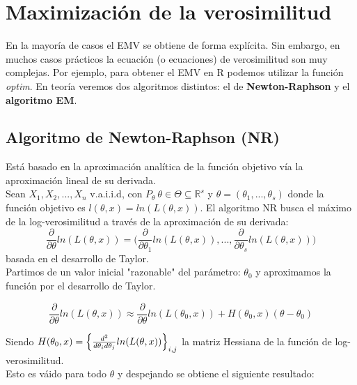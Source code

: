 
\section{Maximización de la verosimilitud}

En la mayoría de casos el EMV se obtiene de forma explícita. Sin embargo, en muchos casos prácticos la ecuación (o ecuaciones) de verosimilitud son muy complejas.
Por ejemplo, para obtener el EMV en R podemos utilizar la función \textit{optim}. En teoría veremos dos algoritmos distintos: el de \textbf{Newton-Raphson} y el \textbf{algoritmo EM}. 

\subsection*{Algoritmo de Newton-Raphson (NR)}

Está basado en la aproximación analítica de la función objetivo vía la aproximación lineal de su derivada. \\

Sean $X_1, X_2,...,X_n$ v.a.i.i.d, con $P_\theta\ \theta\in\Theta\subseteq \mathbb{R}^s$ y $\theta=(\theta_1,...,\theta_s)$ donde la función objetivo es $l(\theta,x)=ln(L(\theta,x))$.
El algoritmo NR busca el máximo de la log-verosimilitud a través de la aproximación de su derivada: 
$$\frac{\partial}{\partial\theta}ln(L(\theta,x))=\Big(\frac{\partial}{\partial\theta_1}ln(L(\theta,x)),...,\frac{\partial}{\partial\theta_s}ln(L(\theta,x))\Big)$$
basada en el desarrollo de Taylor.\\

Partimos de un valor inicial "razonable" del parámetro: $\theta_0$ y aproximamos la función por el desarrollo de Taylor.

$$\frac{\partial}{\partial\theta}ln(L(\theta,x))\approx\frac{\partial}{\partial\theta}ln(L(\theta_0,x))+H(\theta_0,x)(\theta-\theta_0)$$

Siendo $H(\theta_0,x)=\Big{\{}\frac{d^2}{d\theta_i d\theta_j}ln(L(\theta,x))\Big{\}}_{i,j}$ la matriz Hessiana de la función de log-verosimilitud. \\

Esto es váido para todo $\theta$ y despejando se obtiene el siguiente resultado:



